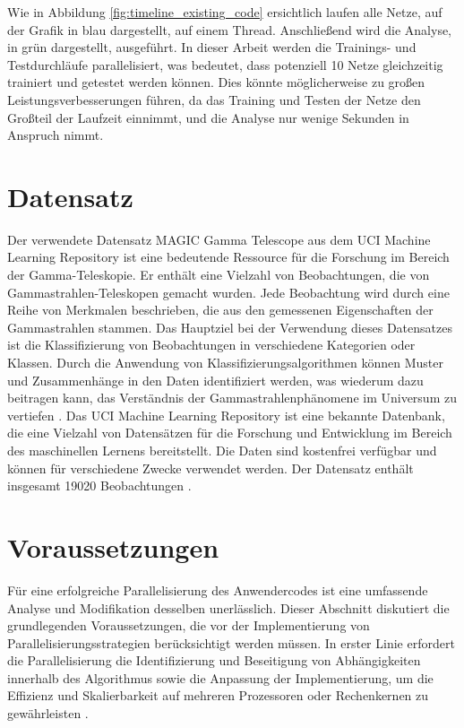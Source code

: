 Wie in Abbildung \ref{fig:timeline_existing_code} ersichtlich laufen alle Netze, auf der Grafik in blau dargestellt, auf einem Thread. Anschließend wird die Analyse, in grün dargestellt, ausgeführt. In dieser Arbeit werden die Trainings- und Testdurchläufe parallelisiert, was bedeutet, dass potenziell 10 Netze gleichzeitig trainiert und getestet werden können. Dies könnte möglicherweise zu großen Leistungsverbesserungen führen, da das Training und Testen der Netze den Großteil der Laufzeit einnimmt, und die Analyse nur wenige Sekunden in Anspruch nimmt. 

\section{Datensatz}
\label{sec:Datensatz}

Der verwendete Datensatz MAGIC Gamma Telescope aus dem UCI Machine Learning Repository ist eine bedeutende Ressource für die Forschung im Bereich der Gamma-Teleskopie. Er enthält eine Vielzahl von Beobachtungen, die von Gammastrahlen-Teleskopen gemacht wurden. Jede Beobachtung wird durch eine Reihe von Merkmalen beschrieben, die aus den gemessenen Eigenschaften der Gammastrahlen stammen. Das Hauptziel bei der Verwendung dieses Datensatzes ist die Klassifizierung von Beobachtungen in verschiedene Kategorien oder Klassen. Durch die Anwendung von Klassifizierungsalgorithmen können Muster und Zusammenhänge in den Daten identifiziert werden, was wiederum dazu beitragen kann, das Verständnis der Gammastrahlenphänomene im Universum zu vertiefen \citep{misc_magic_gamma_telescope_159}. Das UCI Machine Learning Repository ist eine bekannte Datenbank, die eine Vielzahl von Datensätzen für die Forschung und Entwicklung im Bereich des maschinellen Lernens bereitstellt. Die Daten sind kostenfrei verfügbar und können für verschiedene Zwecke verwendet werden. Der Datensatz enthält insgesamt 19020 Beobachtungen \citep{misc_magic_gamma_telescope_159}.

\section{Voraussetzungen}
\label{sec:Voraussetzungen_Parallelisierung}
Für eine erfolgreiche Parallelisierung des Anwendercodes ist eine umfassende Analyse und Modifikation desselben unerlässlich. Dieser Abschnitt diskutiert die grundlegenden Voraussetzungen, die vor der Implementierung von Parallelisierungsstrategien berücksichtigt werden müssen. In erster Linie erfordert die Parallelisierung die Identifizierung und Beseitigung von Abhängigkeiten innerhalb des Algorithmus sowie die Anpassung der Implementierung, um die Effizienz und Skalierbarkeit auf mehreren Prozessoren oder Rechenkernen zu gewährleisten \citep{wilkinson2006parallel}.

